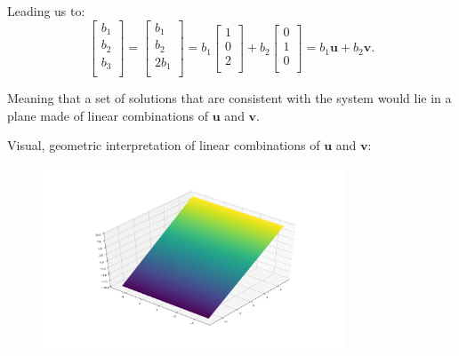 \documentclass{article}
\begin{document}
Leading us to: 
\[
    \begin{bmatrix}
        b_1 \\
        b_2 \\
        b_3 \\
    \end{bmatrix}
    = 
    \begin{bmatrix}
        b_1 \\
        b_2 \\
        2 b_1 \\
    \end{bmatrix}
    = 
    b_1
    \begin{bmatrix}
        1 \\ 0 \\ 2 \\
    \end{bmatrix}
    +
    b_2
    \begin{bmatrix}
        0 \\ 1 \\ 0 \\
    \end{bmatrix}
    =
    b_1
    \mathbf{u}
    +
    b_2
    \mathbf{v}
.\]

Meaning that a set of solutions that are consistent with the system would lie in
a plane made of linear combinations of $\mathbf{u}$ and $\mathbf{v}$.

Visual, geometric interpretation of linear combinations of $\mathbf{u}$ and $\mathbf{v}$:

\begin{figure}[!htbp]
    \centering
    \includegraphics[width=0.8\textwidth]{plane.png}
\end{figure}



\clearpage
\end{document}
